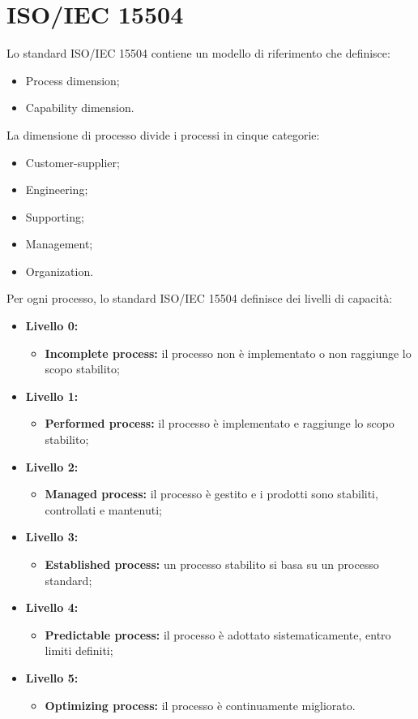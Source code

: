 \section{ISO/IEC 15504}
Lo standard ISO/IEC 15504 contiene un modello di riferimento che definisce:
\begin{itemize}
    \item Process dimension;
    \item Capability dimension.
\end{itemize}
La dimensione di processo divide i processi in cinque categorie:
\begin{itemize}
    \item Customer-supplier;
    \item Engineering;
    \item Supporting;
    \item Management;
    \item Organization. 
\end{itemize}
Per ogni processo, lo standard ISO/IEC 15504 definisce dei livelli di capacità:
\begin{itemize}
    \item \textbf{Livello 0:}
    \begin{itemize}
         \item \textbf{Incomplete process:} il processo non è implementato o non raggiunge lo scopo stabilito;
     \end{itemize}
    \item \textbf{Livello 1:}
    \begin{itemize}
         \item \textbf{Performed process:} il processo è implementato e raggiunge lo scopo stabilito;
    \end{itemize}
    \item \textbf{Livello 2:}
    \begin{itemize}
        \item \textbf{Managed process:} il processo è gestito e i prodotti sono stabiliti, controllati e mantenuti;
    \end{itemize}
    \item \textbf{Livello 3:}
    \begin{itemize}
        \item \textbf{Established process:} un processo stabilito si basa su un processo standard;
    \end{itemize}
    \item \textbf{Livello 4:}
    \begin{itemize}
        \item \textbf{Predictable process:} il processo è adottato sistematicamente, entro limiti definiti;
    \end{itemize}
    \item \textbf{Livello 5:}
    \begin{itemize}
        \item \textbf{Optimizing process:} il processo è continuamente migliorato.
    \end{itemize}
\end{itemize}
